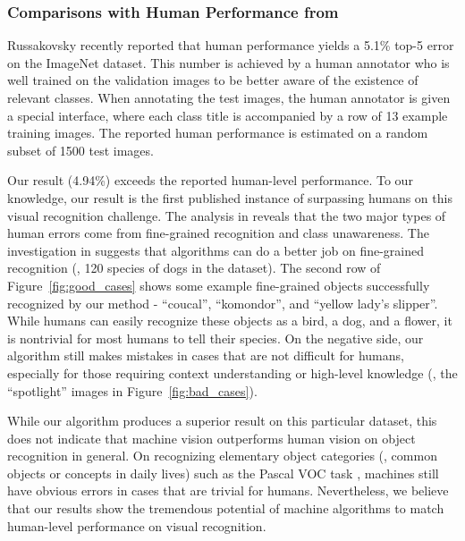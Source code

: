\documentclass[10pt,twocolumn,letterpaper]{article}
\begin{document}
\subsubsection*{Comparisons with Human Performance from \cite{Russakovsky2014}}

Russakovsky \etal \cite{Russakovsky2014} recently reported that human performance yields a 5.1\% top-5 error on the ImageNet dataset. This number is achieved by a human annotator who is well trained on the validation images to be better aware of the existence of relevant classes. When annotating the test images, the human annotator is given a special interface, where each class title is accompanied by a row of 13 example training images. The reported human performance is estimated on a random subset of 1500 test images.

Our result (4.94\%) exceeds the reported human-level performance. To our knowledge, our result is the first published instance of surpassing humans on this visual recognition challenge. The analysis in \cite{Russakovsky2014} reveals that the two major types of human errors come from fine-grained recognition and class unawareness. The investigation in \cite{Russakovsky2014} suggests that algorithms can do a better job on fine-grained recognition (\eg, 120 species of dogs in the dataset). The second row of Figure~\ref{fig:good_cases} shows some example fine-grained objects successfully recognized by our method - ``coucal'', ``komondor'', and ``yellow lady's slipper''. While humans can easily recognize these objects as a bird, a dog, and a flower, it is nontrivial for most humans to tell their species.
On the negative side, our algorithm still makes mistakes in cases that are not difficult for humans, especially for those requiring context understanding or high-level knowledge (\eg, the ``spotlight'' images in Figure~\ref{fig:bad_cases}).

While our algorithm produces a superior result on this particular dataset, this does not indicate that machine vision outperforms human vision on object recognition in general.
On recognizing elementary object categories (\ie, common objects or concepts in daily lives) such as the Pascal VOC task \cite{Everingham2010}, machines still have obvious errors in cases that are trivial for humans.
Nevertheless, we believe that our results show the tremendous potential of machine algorithms to match human-level performance on visual recognition.
\end{document}
